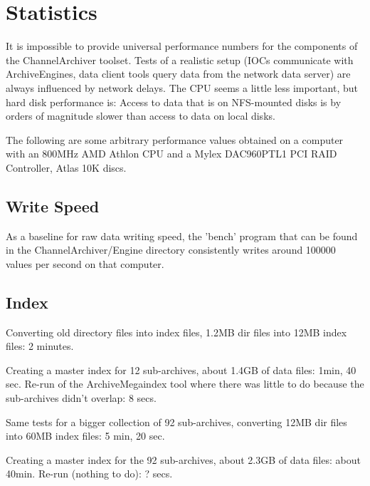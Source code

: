 \section{Statistics}
It is impossible to provide universal performance numbers for the
components of the ChannelArchiver toolset. Tests of a realistic setup
(IOCs communicate with ArchiveEngines, data client tools query data
from the network data server) are always influenced by network delays.
The CPU seems a little less important, but hard disk performance is:
Access to data that is on NFS-mounted disks is by orders of magnitude
slower than access to data on local disks.

The following are some arbitrary performance values obtained on a computer
with an 800MHz AMD Athlon CPU and a Mylex DAC960PTL1 PCI RAID Controller,
Atlas 10K discs.
\subsection{Write Speed}
As a baseline for raw data writing speed, the 'bench' program that can
be found in the ChannelArchiver/Engine directory consistently writes
around 100000 values per second on that computer.

\subsection{Index}
Converting old directory files into index files,
1.2MB dir files into 12MB index files: 2 minutes.

Creating a master index for 12 sub-archives,
about 1.4GB of data files: 1min, 40 sec.
Re-run of the ArchiveMegaindex tool where there was
little to do because the sub-archives didn't overlap: 8 secs.

Same tests for a bigger collection of 92 sub-archives,
converting 12MB dir files into 60MB index files: 5 min, 20 sec.

Creating a master index for the 92 sub-archives,
about 2.3GB of data files: about 40min.
Re-run (nothing to do): ? secs.
